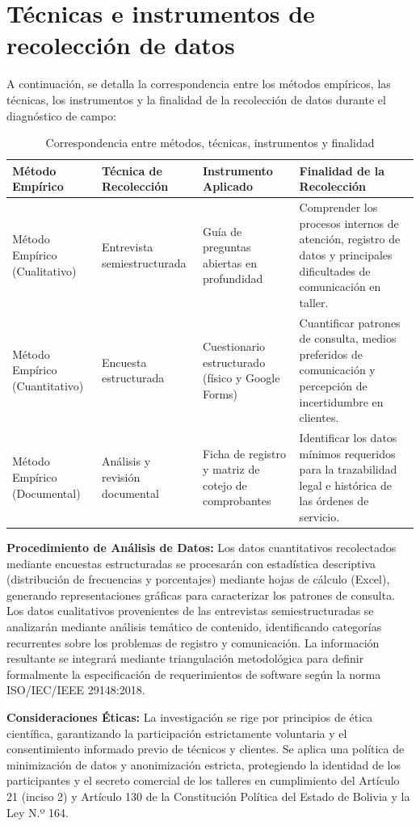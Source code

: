 \section{Técnicas e instrumentos de recolección de datos}

A continuación, se detalla la correspondencia entre los métodos empíricos, las técnicas, los instrumentos y la finalidad de la recolección de datos durante el diagnóstico de campo:

\begin{table}[H]
\centering
\caption{Correspondencia entre métodos, técnicas, instrumentos y finalidad}
\label{tab:tecnicas}
\small
\begin{tabular}{p{2.5cm} p{3cm} p{3cm} p{5cm}}
\toprule
\textbf{Método Empírico} & \textbf{Técnica de Recolección} & \textbf{Instrumento Aplicado} & \textbf{Finalidad de la Recolección} \\
\midrule
Método Empírico (Cualitativo) & Entrevista semiestructurada & Guía de preguntas abiertas en profundidad & Comprender los procesos internos de atención, registro de datos y principales dificultades de comunicación en taller. \\
\addlinespace
Método Empírico (Cuantitativo) & Encuesta estructurada & Cuestionario estructurado (físico y Google Forms) & Cuantificar patrones de consulta, medios preferidos de comunicación y percepción de incertidumbre en clientes. \\
\addlinespace
Método Empírico (Documental) & Análisis y revisión documental & Ficha de registro y matriz de cotejo de comprobantes & Identificar los datos mínimos requeridos para la trazabilidad legal e histórica de las órdenes de servicio. \\
\bottomrule
\end{tabular}
\end{table}

\textbf{Procedimiento de Análisis de Datos:} Los datos cuantitativos recolectados mediante encuestas estructuradas se procesarán con estadística descriptiva (distribución de frecuencias y porcentajes) mediante hojas de cálculo (Excel), generando representaciones gráficas para caracterizar los patrones de consulta. Los datos cualitativos provenientes de las entrevistas semiestructuradas se analizarán mediante análisis temático de contenido, identificando categorías recurrentes sobre los problemas de registro y comunicación. La información resultante se integrará mediante triangulación metodológica para definir formalmente la especificación de requerimientos de software según la norma ISO/IEC/IEEE 29148:2018.

\textbf{Consideraciones Éticas:} La investigación se rige por principios de ética científica, garantizando la participación estrictamente voluntaria y el consentimiento informado previo de técnicos y clientes. Se aplica una política de minimización de datos y anonimización estricta, protegiendo la identidad de los participantes y el secreto comercial de los talleres en cumplimiento del Artículo 21 (inciso 2) y Artículo 130 de la Constitución Política del Estado de Bolivia y la Ley N.º 164.